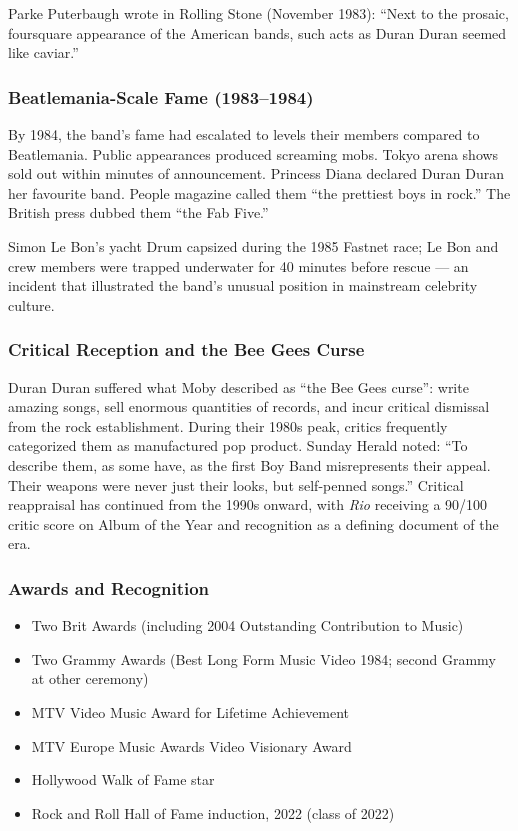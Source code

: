 \documentclass[11pt,letterpaper]{article}
\begin{document}
Parke Puterbaugh wrote in Rolling Stone (November 1983): ``Next to the prosaic, foursquare appearance of the American bands, such acts as Duran Duran seemed like caviar.''

\subsubsection{Beatlemania-Scale Fame (1983--1984)}

By 1984, the band's fame had escalated to levels their members compared to Beatlemania. Public appearances produced screaming mobs. Tokyo arena shows sold out within minutes of announcement. Princess Diana declared Duran Duran her favourite band. People magazine called them ``the prettiest boys in rock.'' The British press dubbed them ``the Fab Five.''

Simon Le Bon's yacht Drum capsized during the 1985 Fastnet race; Le Bon and crew members were trapped underwater for 40 minutes before rescue --- an incident that illustrated the band's unusual position in mainstream celebrity culture.

\subsubsection{Critical Reception and the Bee Gees Curse}

Duran Duran suffered what Moby described as ``the Bee Gees curse'': write amazing songs, sell enormous quantities of records, and incur critical dismissal from the rock establishment. During their 1980s peak, critics frequently categorized them as manufactured pop product. Sunday Herald noted: ``To describe them, as some have, as the first Boy Band misrepresents their appeal. Their weapons were never just their looks, but self-penned songs.'' Critical reappraisal has continued from the 1990s onward, with \textit{Rio} receiving a 90/100 critic score on Album of the Year and recognition as a defining document of the era.

\subsubsection{Awards and Recognition}

\begin{itemize}
  \item Two Brit Awards (including 2004 Outstanding Contribution to Music)
  \item Two Grammy Awards (Best Long Form Music Video 1984; second Grammy at other ceremony)
  \item MTV Video Music Award for Lifetime Achievement
  \item MTV Europe Music Awards Video Visionary Award
  \item Hollywood Walk of Fame star
  \item Rock and Roll Hall of Fame induction, 2022 (class of 2022)
\end{itemize}
\end{document}
